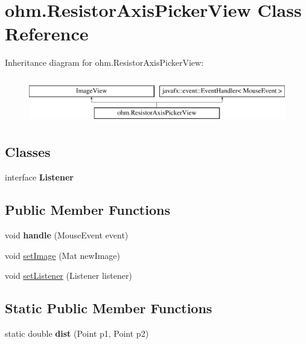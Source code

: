 \hypertarget{classohm_1_1_resistor_axis_picker_view}{}\section{ohm.\+Resistor\+Axis\+Picker\+View Class Reference}
\label{classohm_1_1_resistor_axis_picker_view}
Inheritance diagram for ohm.\+Resistor\+Axis\+Picker\+View\+:\begin{figure}[H]
\begin{center}
\leavevmode
\includegraphics[height=2.000000cm]{classohm_1_1_resistor_axis_picker_view}
\end{center}
\end{figure}
\subsection*{Classes}
\begin{DoxyCompactItemize}
\item 
interface {\bfseries Listener}
\end{DoxyCompactItemize}
\subsection*{Public Member Functions}
\begin{DoxyCompactItemize}
\item 
\hypertarget{classohm_1_1_resistor_axis_picker_view_a2920c90ed17285d7c7a1c93bdc72c429}{}\label{classohm_1_1_resistor_axis_picker_view_a2920c90ed17285d7c7a1c93bdc72c429} 
void {\bfseries handle} (Mouse\+Event event)
\item 
void \hyperlink{classohm_1_1_resistor_axis_picker_view_a9c5a8a703fcad60662496c9d18e5a557}{set\+Image} (Mat new\+Image)
\item 
void \hyperlink{classohm_1_1_resistor_axis_picker_view_ab8d6349385ce137a6c08fee819bbaf8b}{set\+Listener} (Listener listener)
\end{DoxyCompactItemize}
\subsection*{Static Public Member Functions}
\begin{DoxyCompactItemize}
\item 
\hypertarget{classohm_1_1_resistor_axis_picker_view_a961236b719a3819a5dd770bb607f5e78}{}\label{classohm_1_1_resistor_axis_picker_view_a961236b719a3819a5dd770bb607f5e78} 
static double {\bfseries dist} (Point p1, Point p2)
\end{DoxyCompactItemize}


